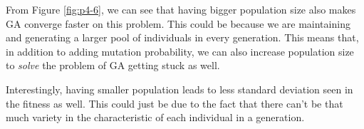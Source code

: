 From Figure \ref{fig:p4-6}, we can see that having bigger population size also makes GA converge faster on this problem. This could be because we are maintaining and generating a larger pool of individuals in every generation. This means that, in addition to adding mutation probability, we can also increase population size to \textit{solve} the problem of GA getting stuck as well.

Interestingly, having smaller population leads to less standard deviation seen in the fitness as well. This could just be due to the fact that there can't be that much variety in the characteristic of each individual in a generation.
